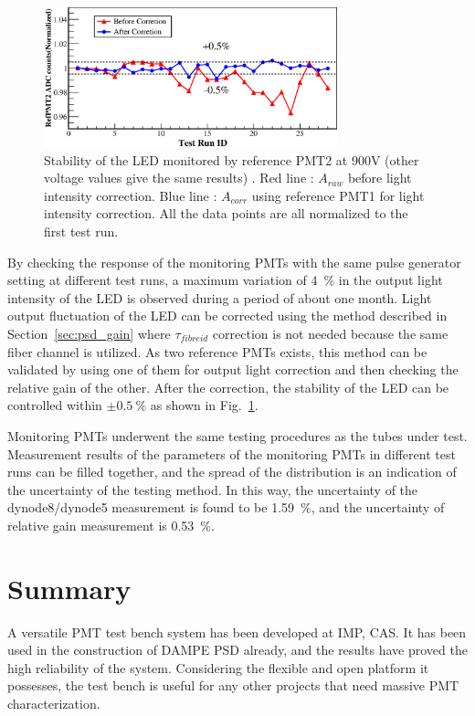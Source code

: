 \documentclass{nst}
\begin{document}
\begin{figure}[!htb]
	\centering
	\includegraphics[width=85mm]{FIG10}
	\caption{Stability of the LED monitored by reference PMT2 at 900V (other voltage values give the same results) . Red line : $A_{raw}$ before light intensity correction. Blue line : $A_{corr}$ using reference PMT1 for light intensity correction. All the data points are all normalized to the first test run.}
	\label{fig:FIG10}
\end{figure} 

By checking the response of the monitoring PMTs with the same pulse generator setting at different test runs, a maximum variation of \SI{4}{\percent} in the output light intensity of the LED is observed during a period of about one month.
Light output fluctuation of the LED can be corrected using the method described in Section~\ref{sec:psd_gain} where $\tau_{fibreid}$ correction is not needed because the same fiber channel is utilized.
As two reference PMTs exists, this method can be validated by using one of them for output light correction and then checking the relative gain of the other. 
After the correction, the stability of the LED can be controlled within $\pm\SI{0.5}{\percent}$ as shown in Fig.~\ref{fig:FIG10}.

Monitoring PMTs underwent the same testing procedures as the tubes under test.
Measurement results of the parameters of the monitoring PMTs in different test runs can be filled together, and the spread of the distribution is an indication of the uncertainty of the testing method.
In this way, the uncertainty of the dynode8/dynode5 measurement is found to be \SI{1.59}{\percent}, and the uncertainty of relative gain measurement is \SI{0.53}{\percent}. 
	
\section{Summary}
\label{sec:summary}
A versatile PMT test bench system has been developed at IMP, CAS.
It has been used in the construction of DAMPE PSD already, and the results have proved the high reliability of the system.
Considering the flexible and open platform it possesses, the test bench is useful for any other projects that need massive PMT characterization. 
\end{document}
